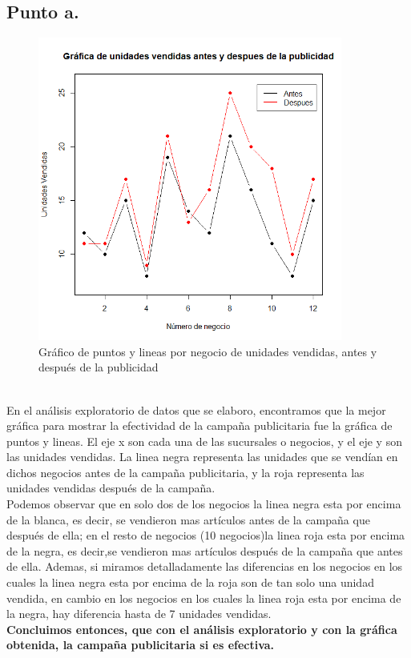\documentclass[letterpaper,12pt,onecolumn,titlepage]{article}
\begin{document}
\subsection{Punto a.}
 \begin{figure}[!h]
    \begin{center}
        \includegraphics[width=10cm]{Figuras/Grafico2.png}
        \caption{Gr\'{a}fico de puntos y lineas por negocio de unidades vendidas, antes y despu\'{e}s de la publicidad}
        \label{fig:Densidad}
    \end{center}
\end{figure}

~\\ En el an\'{a}lisis exploratorio de datos que se elaboro, encontramos que la mejor gr\'{a}fica para mostrar la efectividad de la campa\~{n}a publicitaria fue la gr\'{a}fica de puntos y lineas. El eje x son cada una de las sucursales o negocios, y el eje y son las unidades vendidas. La linea negra representa las unidades que se vend\'{i}an en dichos negocios antes de la campa\~{n}a publicitaria, y la roja representa las unidades vendidas despu\'{e}s de la campa\~{n}a.
~\\ Podemos observar que en solo dos de los negocios la linea negra esta por encima de la blanca, es decir, se vendieron mas art\'{i}culos antes de la campa\~{n}a que despu\'{e}s de ella; en el resto de negocios (10 negocios)la linea roja esta por encima de la negra, es decir,se vendieron mas art\'{i}culos despu\'{e}s de la campa\~{n}a que antes de ella. Ademas, si miramos detalladamente las diferencias en los negocios en los cuales la linea negra esta por encima de la roja son de tan solo una unidad vendida, en cambio en los negocios en los cuales la linea roja esta por encima de la negra, hay diferencia hasta de 7 unidades vendidas.
~\\ \textbf{Concluimos entonces, que con el an\'{a}lisis exploratorio y con la gr\'{a}fica obtenida, la campa\~{n}a publicitaria si es efectiva.}
\end{document}
